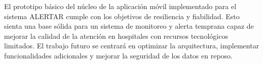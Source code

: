 El prototipo básico del núcleo de la aplicación móvil implementado para el sistema ALERTAR cumple con los objetivos de resiliencia y fiabilidad. Esto sienta una base sólida para un sistema de monitoreo y alerta temprana capaz de mejorar la calidad de la atención en hospitales con recursos tecnológicos limitados. El trabajo futuro se centrará en optimizar la arquitectura, implementar funcionalidades adicionales y mejorar la seguridad de los datos en reposo.

\vfill
\pagebreak
